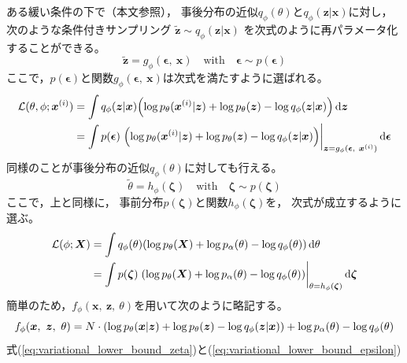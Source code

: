 \documentclass[dvipdfmx, fleqn]{jsarticle}
\begin{document}
ある緩い条件の下で（本文参照），
事後分布の近似\(q_{\phi} (\theta)\)と\(q_{\phi} (\bm{z} | \bm{x})\)に対し，
次のような条件付きサンプリング
\(\tilde{\bm{z}} \sim q_{\phi} (\bm{z} | \bm{x})\)
を次式のように再パラメータ化することができる。
\begin{equation}
    \tilde{\bm{z}} = g_{\phi} (\bm{\epsilon},\ \bm{x})
    \quad \text{with} \quad
    \bm{\epsilon} \sim p(\bm{\epsilon})
\end{equation}
ここで，\(p(\bm{\epsilon})\)と関数\(g_{\phi} (\bm{\epsilon},\ \bm{x})\)は次式を満たすように選ばれる。
\begin{align}
    \mathcal{L}(\theta, \phi; \bm{x}^{(i)})
        & = \int q_{\phi} (\bm{z} | \bm{x}) \qty(\log{p_{\theta} (\bm{x}^{(i)} | \bm{z})} + \log{p_{\theta} (\bm{z})} - \log{q_{\phi} (\bm{z} | \bm{x})}) \dd{\bm{z}}
        \notag \\
        & = \int p(\bm{\epsilon}) \eval{\qty(\log{p_{\theta} (\bm{x}^{(i)} | \bm{z})} + \log{p_{\theta} (\bm{z})} - \log{q_{\phi} (\bm{z} | \bm{x})})}_{\bm{z} = g_{\phi} (\bm{\epsilon},\ \bm{x}^{(i)})} \dd{\bm{\epsilon}}
    \label{eq:variational_lower_bound_epsilon}
\end{align}
同様のことが事後分布の近似\(q_{\phi} (\theta)\)に対しても行える。
\begin{equation}
    \tilde{\theta} = h_{\phi} (\bm{\zeta})
    \quad \text{with} \quad
    \bm{\zeta} \sim p(\bm{\zeta})
\end{equation}
ここで，上と同様に，
事前分布\(p(\bm{\zeta})\)と関数\(h_{\phi} (\bm{\zeta})\)を，
次式が成立するように選ぶ。
\begin{align}
    \mathcal{L}(\phi; \bm{X})
        & = \int q_{\phi} (\theta) \qty(\log{p_{\theta} (\bm{X})} + \log{p_{\alpha} (\theta)} - \log{q_{\phi} (\theta)}) \dd{\theta}
        \notag \\
        & = \int p(\bm{\zeta}) \eval{\qty(\log{p_{\theta} (\bm{X})} + \log{p_{\alpha} (\theta)} - \log{q_{\phi} (\theta)})}_{\theta = h_{\phi} (\bm{\zeta})} \dd{\bm{\zeta}}
    \label{eq:variational_lower_bound_zeta}
\end{align}
簡単のため，\(f_{\phi} (\bm{x},\ \bm{z},\ \theta)\)を用いて次のように略記する。
\begin{equation}
    f_{\phi} (\bm{x},\ \bm{z},\ \theta) = N \cdot \qty(\log{p_{\theta} (\bm{x} | \bm{z})} + \log{p_{\theta} (\bm{z})} - \log{q_{\phi} (\bm{z} | \bm{x})}) + \log{p_{\alpha} (\theta)} - \log{q_{\phi} (\theta)}
    \label{eq:shorthand}
\end{equation}
式(\ref{eq:variational_lower_bound_zeta})と(\ref{eq:variational_lower_bound_epsilon})
\end{document}
